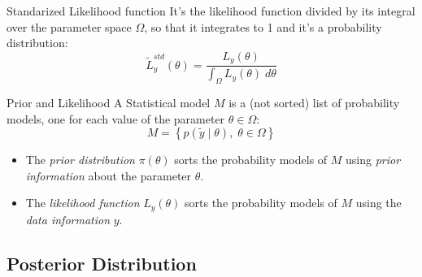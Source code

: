 \begin{definition}{Standarized Likelihood function}{}{}
	It's the likelihood function divided by its integral over the parameter space $\Omega$,
	so that it integrates to 1 and it's a probability distribution:
	\begin{equation}
		\tilde{L}_y^{std}(\theta) = \frac{L_y(\theta)}{\int_{\Omega} L_y(\theta) \;d\theta}
	\end{equation}
\end{definition}


\begin{recap}{Prior and Likelihood}{}{}
	A Statistical model $M$ is a (not sorted) list of probability models, one for
	each value of the parameter $\theta \in \Omega$:
	\begin{equation*}
		M = \left\{ p(\tilde{y}\mid\theta), \; \theta \in \Omega \right\}
	\end{equation*}

	\begin{itemize}
		\item The \emph{prior distribution} $\pi(\theta)$ sorts the probability models of $M$
		      using \emph{prior information} about the parameter $\theta$.
		\item The \emph{likelihood function} $L_y(\theta)$ sorts the probability models of $M$
		      using the \emph{data information} $y$.
	\end{itemize}
\end{recap}

\subsection{Posterior Distribution}

